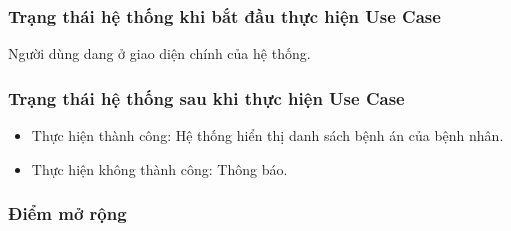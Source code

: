 \subsubsection{Trạng thái hệ thống khi bắt đầu thực hiện Use Case}
Người dùng dang ở giao diện chính của hệ thống.

\subsubsection{Trạng thái hệ thống sau khi thực hiện Use Case}
\begin{itemize}
    \item Thực hiện thành công: Hệ thống hiển thị danh sách bệnh án của bệnh nhân.
    \item Thực hiện không thành công: Thông báo.
\end{itemize}

\subsubsection{Điểm mở rộng}